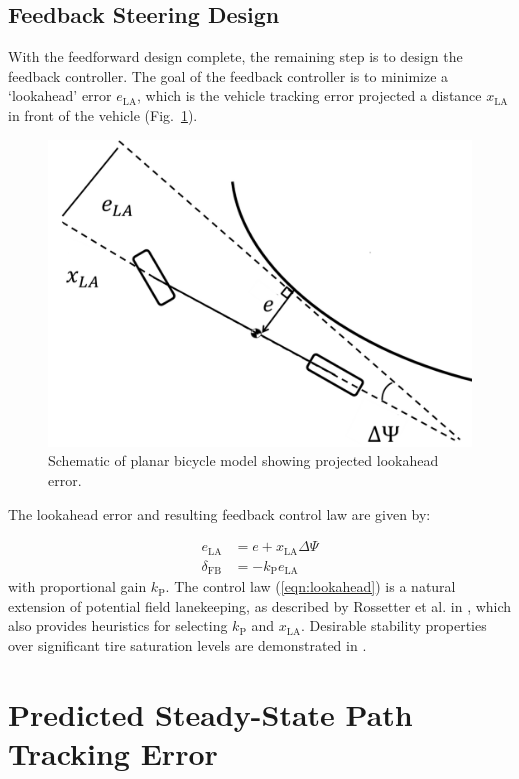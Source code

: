 \documentclass{nVSD2e}
\theoremstyle{plain}
\theoremstyle{definition}
\theoremstyle{remark}
\begin{document}
\subsection{Feedback Steering Design}
\label{sec:lookahead}

With the feedforward design complete, the remaining step is to design the feedback controller. The goal of the feedback controller is to
minimize a `lookahead' error $e_\mathrm{LA}$, which is the vehicle tracking error projected a distance 
$x_\mathrm{LA}$ in front of the vehicle (Fig.~\ref{fig:lookaheadSchematic}).

\begin{figure}[h]
\centering
\includegraphics[width=.5\columnwidth]{figures/lookaheadSchematic.png}
\caption{Schematic of planar bicycle model showing projected lookahead error.}
\label{fig:lookaheadSchematic}
\end{figure}

The lookahead error and resulting feedback control law are given by:

\begin{subequations}
\label{eqn:lookahead}
\begin{align}
	e_\mathrm{LA}&=e+x_\mathrm{LA}\Delta\Psi \\
	\delta_\mathrm{FB} &= -k_\mathrm{P}e_\mathrm{LA}
\end{align}
\end{subequations}
with proportional gain $k_\mathrm{P}$. The control law (\ref{eqn:lookahead}) is a natural extension of potential field lanekeeping, as described by Rossetter et al. in \cite{rosseter}, which also provides heuristics for 
selecting $k_\mathrm{P}$ and $x_\mathrm{LA}$. Desirable stability properties over significant tire saturation levels are demonstrated in \cite{talvala}. 

\section{Predicted Steady-State Path Tracking Error}
\label{sec:predSS}
\end{document}
